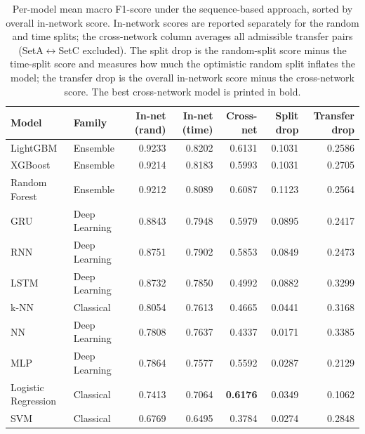 \begin{table}[htbp]
\caption{Per-model mean macro F1-score under the sequence-based approach, sorted by overall in-network score. In-network scores are reported separately for the random and time splits; the cross-network column averages all admissible transfer pairs (SetA$\leftrightarrow$SetC excluded). The split drop is the random-split score minus the time-split score and measures how much the optimistic random split inflates the model; the transfer drop is the overall in-network score minus the cross-network score. The best cross-network model is printed in bold.}
\label{tab:q6_per_model}
\centering
\small
\begin{tabular}{llrrrrr}
\toprule
Model & Family & In-net (rand) & In-net (time) & Cross-net & Split drop & Transfer drop \\
\midrule
LightGBM & Ensemble & 0.9233 & 0.8202 & 0.6131 & 0.1031 & 0.2586 \\
XGBoost & Ensemble & 0.9214 & 0.8183 & 0.5993 & 0.1031 & 0.2705 \\
Random Forest & Ensemble & 0.9212 & 0.8089 & 0.6087 & 0.1123 & 0.2564 \\
GRU & Deep Learning & 0.8843 & 0.7948 & 0.5979 & 0.0895 & 0.2417 \\
RNN & Deep Learning & 0.8751 & 0.7902 & 0.5853 & 0.0849 & 0.2473 \\
LSTM & Deep Learning & 0.8732 & 0.7850 & 0.4992 & 0.0882 & 0.3299 \\
k-NN & Classical & 0.8054 & 0.7613 & 0.4665 & 0.0441 & 0.3168 \\
NN & Deep Learning & 0.7808 & 0.7637 & 0.4337 & 0.0171 & 0.3385 \\
MLP & Deep Learning & 0.7864 & 0.7577 & 0.5592 & 0.0287 & 0.2129 \\
Logistic Regression & Classical & 0.7413 & 0.7064 & \textbf{0.6176} & 0.0349 & 0.1062 \\
SVM & Classical & 0.6769 & 0.6495 & 0.3784 & 0.0274 & 0.2848 \\
\bottomrule
\end{tabular}
\end{table}
